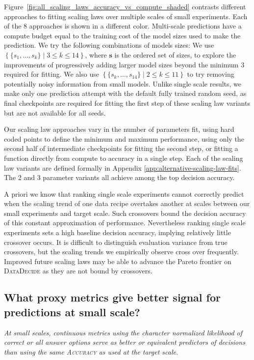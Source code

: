 \documentclass{article}
\theoremstyle{plain}
\theoremstyle{definition}
\theoremstyle{remark}
\newcommand{\numScales}{14}
\newcommand{\projSuite}{\textsc{DataDecide}}
\newcommand{\primaryMetric}{\textsc{Accuracy}}
\newcommand{\twoClass}{decision accuracy}
\newcommand{\rankingMethod}{ranking single scale experiments}
\newcommand{\numScalingLaws}{8}
\begin{document}
Figure~\ref{fig:all_scaling_laws_accuracy_vs_compute_shaded} contrasts different approaches to fitting scaling laws over multiple scales of small experiments. Each of the \numScalingLaws{} approaches is shown in a different color. Multi-scale predictions have a compute budget equal to the training cost of the model sizes used to make the prediction. We try the following combinations of models sizes: We use $\left\{ \{s_1, \dots, s_k\} \mid 3 \leq k \leq \numScales{} \right\}$, where $\mathbf{s}$ is the ordered set of sizes, to explore the improvements of progressively adding larger model sizes beyond the minimum 3 required for fitting. We also use $\left\{ \{s_k, \dots, s_{\numScales}\} \mid 2 \leq k \leq 11 \right\}$ to try removing potentially noisy information from small models. Unlike single scale results, we make only one prediction attempt with the default fully trained random seed, as final checkpoints are required for fitting the first step of these scaling law variants but are not available for all seeds.

Our scaling law approaches vary in the number of parameters fit, using hard coded points to define the minimum and maximum performance, using only the second half of intermediate checkpoints for fitting the second step, or fitting a function directly from compute to accuracy in a single step. Each of the scaling law variants are defined formally in Appendix \ref{app:alternative-scaling-law-fits}. The 2 and 3 parameter variants all achieve among the top \twoClass{}.

A priori we know that \rankingMethod{} cannot correctly predict when the scaling trend of one data recipe overtakes another at scales between our small experiments and target scale. Such crossovers bound the \twoClass{} of this constant approximation of performance. Nevertheless \rankingMethod{} sets a high baseline \twoClass{}, implying relatively little crossover occurs. It is difficult to distinguish evaluation variance from true crossovers, but the scaling trends we empirically observe cross over frequently. Improved future scaling laws may be able to advance the Pareto frontier on \projSuite{} as they are not bound by crossovers.





\subsection{What proxy metrics give better signal for predictions at small scale?}
\label{sec:proxy_metrics_results}
\begin{tcolorbox}[colback=yellow!10!white, colframe=yellow!50!white, boxrule=0pt, sharp corners, width=\linewidth]
\textit{At small scales, continuous metrics using the character normalized likelihood of correct or all answer options serve as better or equivalent predictors of decisions than using the same \primaryMetric{} as used at the target scale.}
\end{tcolorbox}
\end{document}
